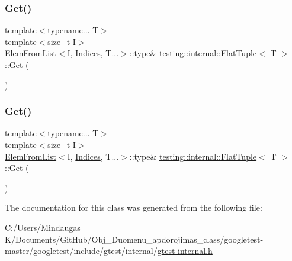\subsubsection{\texorpdfstring{Get()}{Get()}\hspace{0.1cm}{\footnotesize\ttfamily [3/4]}}
{\footnotesize\ttfamily template$<$typename... T$>$ \\
template$<$size\+\_\+t I$>$ \\
\mbox{\hyperlink{structtesting_1_1internal_1_1_elem_from_list}{Elem\+From\+List}}$<$I, \mbox{\hyperlink{classtesting_1_1internal_1_1_flat_tuple_a004b42fc11ac1a85a9b1560fa83cdf77}{Indices}}, T...$>$\+::type\& \mbox{\hyperlink{classtesting_1_1internal_1_1_flat_tuple}{testing\+::internal\+::\+Flat\+Tuple}}$<$ T $>$\+::Get (\begin{DoxyParamCaption}{ }\end{DoxyParamCaption})\hspace{0.3cm}{\ttfamily [inline]}}

\mbox{\label{classtesting_1_1internal_1_1_flat_tuple_a48a13560f8963f727d81a7922e3b3e50}} 
\subsubsection{\texorpdfstring{Get()}{Get()}\hspace{0.1cm}{\footnotesize\ttfamily [4/4]}}
{\footnotesize\ttfamily template$<$typename... T$>$ \\
template$<$size\+\_\+t I$>$ \\
\mbox{\hyperlink{structtesting_1_1internal_1_1_elem_from_list}{Elem\+From\+List}}$<$I, \mbox{\hyperlink{classtesting_1_1internal_1_1_flat_tuple_a004b42fc11ac1a85a9b1560fa83cdf77}{Indices}}, T...$>$\+::type\& \mbox{\hyperlink{classtesting_1_1internal_1_1_flat_tuple}{testing\+::internal\+::\+Flat\+Tuple}}$<$ T $>$\+::Get (\begin{DoxyParamCaption}{ }\end{DoxyParamCaption})\hspace{0.3cm}{\ttfamily [inline]}}



The documentation for this class was generated from the following file\+:\begin{DoxyCompactItemize}
\item 
C\+:/\+Users/\+Mindaugas K/\+Documents/\+Git\+Hub/\+Obj\+\_\+\+Duomenu\+\_\+apdorojimas\+\_\+class/googletest-\/master/googletest/include/gtest/internal/\mbox{\hyperlink{googletest-master_2googletest_2include_2gtest_2internal_2gtest-internal_8h}{gtest-\/internal.\+h}}\end{DoxyCompactItemize}
